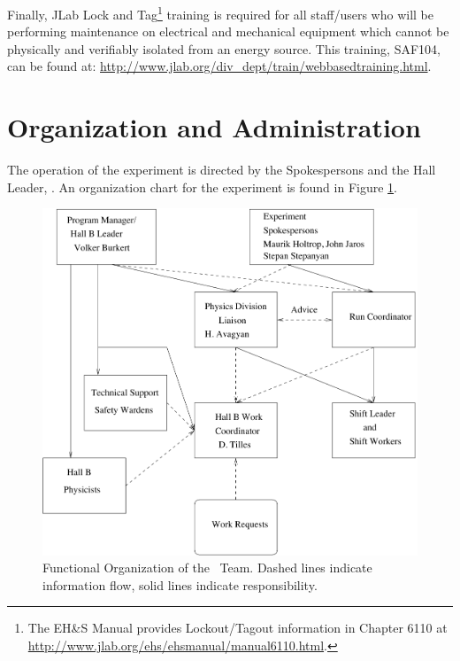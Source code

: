 \documentclass[11pt]{article}
\begin{document}
Finally, JLab Lock and Tag\footnote{The EH\&S Manual provides Lockout/Tagout
information in Chapter 6110 at \url{http://www.jlab.org/ehs/ehsmanual/manual6110.html}.}
training is required for all staff/users who will be
performing maintenance on electrical and mechanical equipment which  
cannot be physically and verifiably isolated from an energy
source.   This training, SAF104, can be found at:   \newline
\url{http://www.jlab.org/div_dept/train/webbasedtraining.html}.



\section{ Organization  and Administration}

The operation of the experiment is directed by the Spokespersons and the Hall 
Leader, \HALLLEADER. An organization chart for the experiment is
found in Figure \ref{HALLCHART}.

\begin{figure}
\includegraphics[width=\textwidth]{coo_HallB_HPSorg.pdf}
%
%
%
%
\caption[Dummy caption.]{Functional Organization of the \HALL\ Team. Dashed
lines indicate information flow, solid lines indicate responsibility.}
\label{HALLCHART} 
\end{figure}
\end{document}
